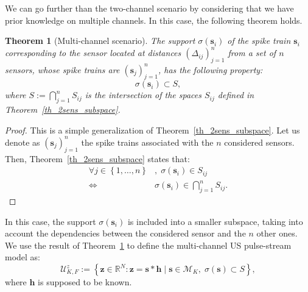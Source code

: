 \documentclass{article}
\newtheorem{theorem}{Theorem}
\newcommand{\vect}[1]{\bm{#1}}
\theoremstyle{definition}
\begin{document}
We can go further than the two-channel scenario by considering that we have prior knowledge on multiple channels. In this case, the following theorem holds.
\begin{theorem}[Multi-channel scenario]
	\label{th_multisens_subspace}
	 The support $\sigma \left(\vect{s}_i\right)$ of the spike train $\vect{s}_i$ corresponding to the sensor located at distances $\left(\Delta_{ij}\right)_{j=1}^n$ from a set of $n$ sensors, whose spike trains are $\left(\vect{s}_j\right)_{j=1}^n$, has the following property:
	\begin{equation*}
	\sigma \left(\vect{s}_i\right) \subset S,
	\end{equation*}
	where $S := \bigcap \limits_{j=1}^{n} S_{ij} $ is the intersection of the spaces $S_{ij}$ defined in Theorem~\ref{th_2sens_subspace}.
\end{theorem}
\begin{proof}
	This is a simple generalization of Theorem~\ref{th_2sens_subspace}. Let us denote as $\left(\vect{s}_j\right)_{j=1}^n$ the spike trains associated with the $n$ considered sensors.
	Then, Theorem~\ref{th_2sens_subspace} states that:
	\begin{align*}
	 \forall j \in \left\lbrace 1,\dots,n \right \rbrace &, \; \sigma \left(\vect{s}_i\right) \in S_{ij} \\
	 \Leftrightarrow & \sigma \left(\vect{s}_i\right) \in \bigcap \limits_{j=1}^{n} S_{ij}. 
	\end{align*} 
\end{proof}

In this case, the support $\sigma\left(\vect{s}_i\right)$ is included into a smaller subspace, taking into account the dependencies between the considered sensor and the $n$ other ones. We use the result of Theorem~\ref{th_multisens_subspace} to define the multi-channel US pulse-stream model as:
\begin{equation}
\label{eq_pulse_USstream_model}
\mathcal{U}^z_{K,F}:=\left\lbrace \vect{z} \in \mathbb{R}^N: \vect{z} = \vect{s} \ast \vect{h} \; | \;\vect{s} \in \mathcal{M}_K, \; \sigma\left(\vect{s}\right) \subset S \right\rbrace,
\end{equation} 
where $\vect{h}$ is supposed to be known. 
\end{document}
